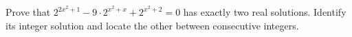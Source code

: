 Prove that $2^{2x^2+1}-9\cdot2^{x^2+x}+2^{x^2+2}=0$ has exactly two real solutions. Identify its integer solution and locate the other between consecutive integers.
